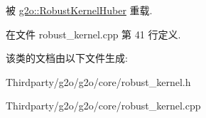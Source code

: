 被 \hyperlink{classg2o_1_1RobustKernelHuber_a7e9ee4bbc9483dcd3d10a4c1f506a4d2}{g2o\-::\-Robust\-Kernel\-Huber} 重载.



在文件 robust\-\_\-kernel.\-cpp 第 41 行定义.



该类的文档由以下文件生成\-:\begin{DoxyCompactItemize}
\item 
Thirdparty/g2o/g2o/core/robust\-\_\-kernel.\-h\item 
Thirdparty/g2o/g2o/core/robust\-\_\-kernel.\-cpp\end{DoxyCompactItemize}
